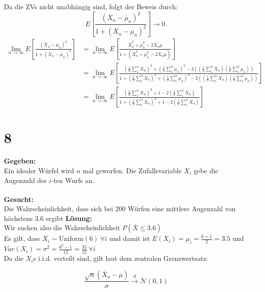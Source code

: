 \documentclass{article}
\begin{document}
Da die ZVs nicht unabhängig sind, folgt der Beweis durch:
\[E\left[\frac{(\overline{X}_n - \overline{\mu}_n)^2}{1+ (\overline{X}_n - \overline{\mu}_n)^2}\right] \longrightarrow 0.\] 
\begin{align*}
    \lim_{n \longrightarrow \infty} E\left[\frac{(\overline{X}_n - \overline{\mu}_n)^2}{1+ (\overline{X}_n - \overline{\mu}_n)^2}\right] &= \lim_{n \longrightarrow \infty} E\left[\frac{\overline{X}_n^2 + \overline{\mu}_n^2- 2\overline{X}_n\overline{\mu}}{1+ (\overline{X}_n^2 + \overline{\mu}_n^2- 2\overline{X}_n\overline{\mu})}\right] \\
    &= \lim_{n \longrightarrow \infty} E\left[\frac{(\frac{1}{n}\sum_{1}^{n} X_n)^2+ (\frac{1}{n}\sum_{1}^{n} \mu_n)^2 - 2((\frac{1}{n}\sum_{1}^{n} X_n) (\frac{1}{n}\sum_{1}^{n} \mu_n))}{1+ (\frac{1}{n}\sum_{1}^{n} X_n)^2+ (\frac{1}{n}\sum_{1}^{n} \mu_n)^2 - 2((\frac{1}{n}\sum_{1}^{n} X_n) (\frac{1}{n}\sum_{1}^{n} \mu_n))}\right] \\
    &= \lim_{n \longrightarrow \infty} E\left[\frac{(\frac{1}{n}\sum_{1}^{n} X_n)^2+ 1 -2(\frac{1}{n}\sum_{1}^{n} X_n)}{1+(\frac{1}{n}\sum_{1}^{n} X_n)^2+ 1 -2(\frac{1}{n}\sum_{1}^{n} X_n)}\right]
\end{align*}
\section*{8}
\textbf{Gegeben:}\\

Ein idealer Würfel wird $n$ mal geworfen. Die Zufallsvariable $X_i$ gebe die Augenzahl des $i$-ten Wurfs an. \\\\
\textbf{Gesucht:}\\

Die Wahrscheinlichkeit, dass sich bei 200 Würfen eine mittlere Augenzahl von höchstens $3.6$ ergibt
\textbf{Lösung:}\\

Wir suchen also die Wahrscheinlichkeit $P(\overline{X} \leq 3.6)$ \\

Es gilt, dass $X_i \sim \text{Uniform}(6) ~ \forall i$ und damit ist $E(X_i) =\mu_i = \frac{6+1}{2} = 3.5$ und $Var(X_i) = \sigma^2= \frac{6^2- 1}{12} = \frac{35}{12}~ \forall i$ \\

Da die $X_i$s i.i.d. verteilt sind, gilt laut dem zentralen Grenzwertsatz:

\[\frac{\sqrt{n}(\overline{X}_n- \mu)}{\sigma} \overset{d}{\rightarrow} \mathcal{N}(0,1)\]
\end{document}
